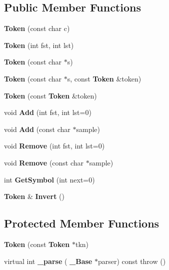 \subsection*{Public Member Functions}
\begin{DoxyCompactItemize}
\item 
\mbox{\label{classbnf_1_1_token_aed0696c50a0fae76696157f108fbbc43}} 
{\bfseries Token} (const char c)
\item 
\mbox{\label{classbnf_1_1_token_aba69ea21ddea7965460bec26567ff11a}} 
{\bfseries Token} (int fst, int lst)
\item 
\mbox{\label{classbnf_1_1_token_a1a143d2e52f9e2f2ebf28fb23983b23e}} 
{\bfseries Token} (const char $\ast$s)
\item 
\mbox{\label{classbnf_1_1_token_aa2a87c84514305d23d686e76a13b531a}} 
{\bfseries Token} (const char $\ast$s, const \textbf{ Token} \&token)
\item 
\mbox{\label{classbnf_1_1_token_a80f5a655347bfd8719d5ed906fa8563f}} 
{\bfseries Token} (const \textbf{ Token} \&token)
\item 
\mbox{\label{classbnf_1_1_token_a1006b1383cd19db732176d9a2179f454}} 
void {\bfseries Add} (int fst, int lst=0)
\item 
\mbox{\label{classbnf_1_1_token_aebbe469ff4a8c576d136472758a68e1a}} 
void {\bfseries Add} (const char $\ast$sample)
\item 
\mbox{\label{classbnf_1_1_token_a5975313bf65e86a093bdd369b02f986e}} 
void {\bfseries Remove} (int fst, int lst=0)
\item 
\mbox{\label{classbnf_1_1_token_acbe7cc5ba1f6b22f16bfd6790510bba6}} 
void {\bfseries Remove} (const char $\ast$sample)
\item 
\mbox{\label{classbnf_1_1_token_afc1cc232799ef3977c968897a227a114}} 
int {\bfseries Get\+Symbol} (int next=0)
\item 
\mbox{\label{classbnf_1_1_token_a0e47888270947f053645d3571a72e39a}} 
\textbf{ Token} \& {\bfseries Invert} ()
\end{DoxyCompactItemize}
\subsection*{Protected Member Functions}
\begin{DoxyCompactItemize}
\item 
\mbox{\label{classbnf_1_1_token_af0f404eb33b567648857bc249b01d217}} 
{\bfseries Token} (const \textbf{ Token} $\ast$tkn)
\item 
\mbox{\label{classbnf_1_1_token_a94082cabb74558f2803657cae0a2ab44}} 
virtual int {\bfseries \+\_\+parse} (\textbf{ \+\_\+\+Base} $\ast$parser) const  throw ()
\end{DoxyCompactItemize}
